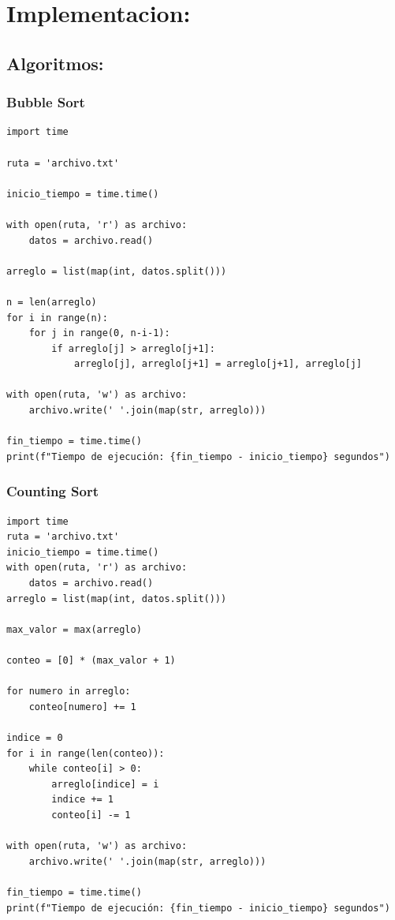 \newpage
\section{Implementacion:}
\subsection{Algoritmos:}
\subsubsection{Bubble Sort}
\begin{verbatim}
import time

ruta = 'archivo.txt'

inicio_tiempo = time.time()

with open(ruta, 'r') as archivo:
    datos = archivo.read()

arreglo = list(map(int, datos.split()))

n = len(arreglo)
for i in range(n):
    for j in range(0, n-i-1):
        if arreglo[j] > arreglo[j+1]:
            arreglo[j], arreglo[j+1] = arreglo[j+1], arreglo[j]

with open(ruta, 'w') as archivo:
    archivo.write(' '.join(map(str, arreglo)))

fin_tiempo = time.time()
print(f"Tiempo de ejecución: {fin_tiempo - inicio_tiempo} segundos")
\end{verbatim}
\subsubsection{Counting Sort}
\begin{verbatim}
import time
ruta = 'archivo.txt'
inicio_tiempo = time.time()
with open(ruta, 'r') as archivo:
    datos = archivo.read()
arreglo = list(map(int, datos.split()))

max_valor = max(arreglo)

conteo = [0] * (max_valor + 1)

for numero in arreglo:
    conteo[numero] += 1

indice = 0
for i in range(len(conteo)):
    while conteo[i] > 0:
        arreglo[indice] = i
        indice += 1
        conteo[i] -= 1

with open(ruta, 'w') as archivo:
    archivo.write(' '.join(map(str, arreglo)))

fin_tiempo = time.time()
print(f"Tiempo de ejecución: {fin_tiempo - inicio_tiempo} segundos")
\end{verbatim}

